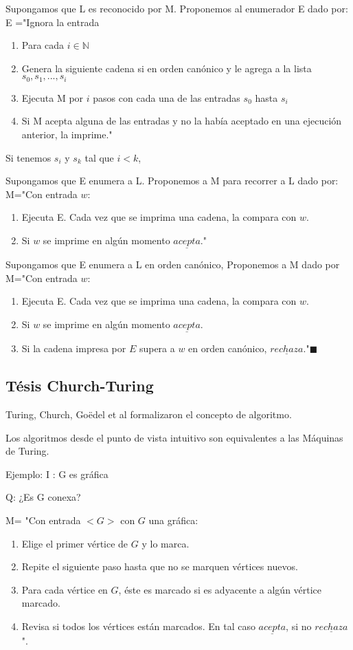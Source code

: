 \documentclass{homework}
\begin{document}
Supongamos que L es reconocido por M. Proponemos al enumerador E dado por:
E ="Ignora la entrada
\begin{enumerate}
	\item Para cada $i \in \mathds{N}$
	\item Genera la siguiente cadena si en orden canónico y le agrega a la lista $s_0, s_1,...,s_i$
	\item Ejecuta M por $i$ pasos con cada una de las entradas $s_0$ hasta $s_i$
	\item Si M acepta alguna de las entradas y no la había aceptado en una ejecución anterior, la imprime."
\end{enumerate}

Si tenemos $s_i$ y $s_k$ tal que $i < k$, 

Supongamos que E enumera a L. Proponemos a M para recorrer a L dado por:
M="Con entrada $w$:
\begin{enumerate}
	\item Ejecuta E. Cada vez que se imprima una cadena, la compara con $w$.
	\item Si $w$ se imprime en algún momento $\underline{acepta}$."
\end{enumerate}

Supongamos que E enumera a L en orden canónico, Proponemos a M dado por
M="Con entrada $w$:
\begin{enumerate}
	\item Ejecuta E. Cada vez que se imprima una cadena, la compara con $w$.
	\item Si $w$ se imprime en algún momento $\underline{acepta}$.
	\item Si la cadena impresa por $E$ supera a $w$ en orden canónico, $\underline{rechaza}$."$\blacksquare$
\end{enumerate}


\subsection{T\'esis Church-Turing}
Turing, Church, Goëdel et al formalizaron el concepto de algoritmo.

Los algoritmos desde el punto de vista intuitivo son equivalentes a las Máquinas de Turing.

Ejemplo:
I : G es gráfica

Q: ¿Es G conexa?

M= "Con entrada $<G>$ con $G$ una gráfica:
\begin{enumerate}
	\item Elige el primer vértice de $G$ y lo marca.
	\item Repite el siguiente paso hasta que no se marquen vértices nuevos.
	\item Para cada vértice en $G$, éste es marcado si es adyacente a algún vértice marcado.
	\item Revisa si todos los vértices están marcados. En tal caso $\underline{acepta}$, si no $\underline{rechaza}$".
\end{enumerate}
\end{document}

